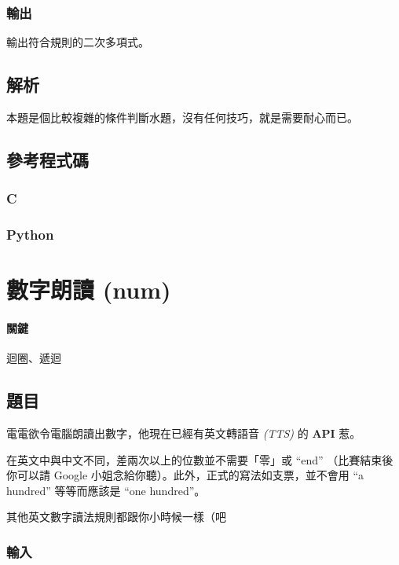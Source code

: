 \documentclass[a4paper,10pt]{article}
\begin{document}
\subsubsection{輸出}

輸出符合規則的二次多項式。

\subsection{解析}

本題是個比較複雜的條件判斷水題，沒有任何技巧，就是需要耐心而已。

\subsection{參考程式碼}

\subsubsection{C}



\subsubsection{Python}



\section{數字朗讀 (num)}

\paragraph{關鍵} 迴圈、遞迴

\subsection{題目}

電電欲令電腦朗讀出數字，他現在已經有英文轉語音 \textit{(TTS)} 的 \textbf{API} 惹。

在英文中與中文不同，差兩次以上的位數並不需要「零」或 ``end'' （比賽結束後你可以請 Google 小姐念給你聽）。此外，正式的寫法如支票，並不會用 ``a hundred'' 等等而應該是 ``one hundred''。

其他英文數字讀法規則都跟你小時候一樣（吧

\subsubsection{輸入}
\end{document}
